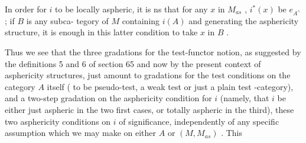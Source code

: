 In order for $i$ to be locally aspheric, it is ns that  for any
$x$ in $M_{as}$ , $i^{*}(x)$ be \hand{\uline{\textcolor{black}{aspheric over}}} $e_{A^{\wedge}}$ ; if $B$ is any  subca-%
tegory of $M$ containing $i(A)$ and generating the asphericity structure,
it is enough in this latter condition to take $x$ in $B$ .

Thus we see that the three gradations for the test-functor notion,
as suggested by the definitions 5 and 6 of section 65 and now by the
present context of asphericity structures, just amount to gradations 
for the test conditions on the category $A$ itself ( to be  pseudo-test, a
weak test or just a plain test -category), and a two-step gradation on
the asphericity condition for $i$ (namely, that $i$ be either just aspheric
in the two first cases, or totally aspheric in the third),  these two
asphericity conditions on $i$   of significance,  independently of
any specific assumption which we may make on either $A$ or $(M,M_{as})$ . This

